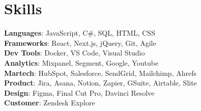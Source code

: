 
\section{Skills}

\begin{itemize}[leftmargin=0.15in, label={}]
    \small{
      \item{
        \textbf{Languages}{: JavaScript, C\#, SQL, HTML, CSS} \\
        \textbf{Frameworks}{: React, Next.js, jQuery, Git, Agile} \\
        \textbf{Dev Tools}{: Docker, VS Code, Visual Studio} \\
        \textbf{Analytics}{: Mixpanel, Segment, Google, Youtube} \\
        \textbf{Martech}{: HubSpot, Salesforce, SendGrid, Mailchimp, Ahrefs } \\
        \textbf{Product}{: Jira, Asana, Notion, Zapier, GSuite, Airtable, Slite} \\
        \textbf{Design}{: Figma, Final Cut Pro, Davinci Resolve} \\
        \textbf{Customer}{: Zendesk Explore} \\
      }
    }
  \end{itemize}